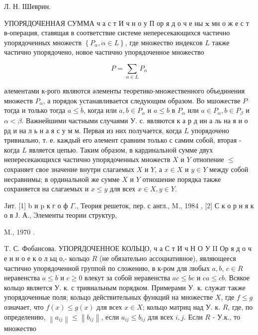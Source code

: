 \documentclass[10pt]{article}
\begin{document}
Л. Н. ІШеврин.



УПОРЯДОЧЕННАЯ СУММА ч а с т И ч н о у П ор я д о ч е ны $\mathbf{x}$ мн о ж е с т в-операция, ставящая в соответствие системе непересекающихся частично упорядоченных множеств $\left\{P_{\alpha}, \alpha \in L\right\}$, где множество индексов $L$ также частично упорядочено, новое частично упорядоченное множество



\[

P=\sum_{\alpha \in L} P_{\alpha}

\]



әлементами к-рого являются әлементы теоретико-множественного объединения множеств $P_{\alpha}$, а порядок устанавливается следующим образом. Во мшожестве $P$ тогда и только тогда $a \leqslant b$, когда или $a, b \in P_{\alpha}$ и $a \leqslant b$ в $P_{\alpha}$ или $a \in P_{\alpha}, b \in P_{\beta}$ и $\alpha<\beta$. Важнейшими частными случаями У. с. являются к а р д ин а ль на я и о рд и на л ь н а я с у м м. Первая из них получается, когда $L$ упорядочено тривиально, т. е. каждый его әлемент сравним только с самим собой, вторая - когда $L$ является цепью. Таким образом, в кардинальной сумме двух непересекающихся частично упорядоченных множеств $X$ и $Y$ отнопение $\leqslant$ сохраняет свое значение внутри слагаемых $X$ и $Y$, а $x \in X$ и $y \in Y$ между собой несравнимы; в ординальной же сумме $X$ и $Y$ отношение порядка также сохраняется на слагаемых и $x \leqslant y$ для всех $x \in X, y \in Y$.



Jит. [1] b и $\mathrm{p}$ к г о ф $\Gamma$., Теория решеток, пер. с англ., M., 1984 , [2] С к о р н я к о в Ј. А., Элементы теории структур,

M., 1970 .

T. С. Фобансова. УПОРЯДОЧЕННОЕ КОЛЬЦО, ч а С т И ч Н О У II Ор я д о ч е н н о е к о л ьц о,- кольцо $R$ (не обязательно ассоциативное), являющееся частично упорядоченной группой по сложению, в к-ром для любых $a, b$, $c \in R$ неравенства $a \leqslant b$ и $c \geqslant 0$ влекут за собой неравенства $a c \leqslant b c$ и $c a \leqslant c b$. Всякое кольцо является У. к. с тривиальным порядком. Примерами У. к. служат также упорядоченные поля; кольцо действительных функций на множестве $X$, где $f \leqslant g$ означает, что $f(x) \leqslant g(x)$ для всех $x \in X$; кольцо матриц над У. к. $R$, где, по определению, $\left\|a_{i j}\right\| \leqslant\left\|b_{i j}\right\|$, если $a_{i j} \leqslant b_{i j}$ для всех $i, j$. Если $R$ - У.к., то множество
\end{document}
